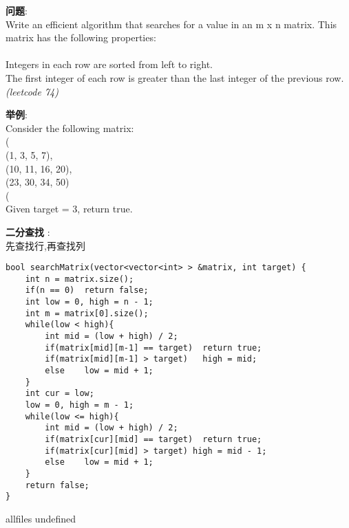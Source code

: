 \documentclass{article}
\begin{document}
\begin{CJK}{UTF8}{gbsn}     %

\else
    
\begin{description}
    \item{\textbf{问题}}:\\
Write an efficient algorithm that searches for a value in an m x n matrix. This matrix has the following properties:\\
\\
Integers in each row are sorted from left to right.\\
The first integer of each row is greater than the last integer of the previous row.\\
 \textit{(leetcode 74)}
	\item{\textbf{举例}}:\\
Consider the following matrix:\\
(\\
  (1,   3,  5,  7),\\
  (10, 11, 16, 20),\\
  (23, 30, 34, 50)\\
(\\
Given target = 3, return true.
    \item{\textbf{二分查找}} : 
    \\先查找行,再查找列
    \begin{lstlisting}
bool searchMatrix(vector<vector<int> > &matrix, int target) {
	int n = matrix.size();
	if(n == 0)	return false;
	int low = 0, high = n - 1;
	int m = matrix[0].size();
	while(low < high){
		int mid = (low + high) / 2;
		if(matrix[mid][m-1] == target)	return true;
		if(matrix[mid][m-1] > target)	high = mid;
		else	low = mid + 1;
	}
	int cur = low;
	low = 0, high = m - 1;
	while(low <= high){
		int mid = (low + high) / 2;
		if(matrix[cur][mid] == target)	return true;
		if(matrix[cur][mid] > target) high = mid - 1;
		else	low = mid + 1;
	}
	return false;
}
    \end{lstlisting}
\end{description}

\fi

\ifx allfiles undefined
\end{CJK}
\end{document}
